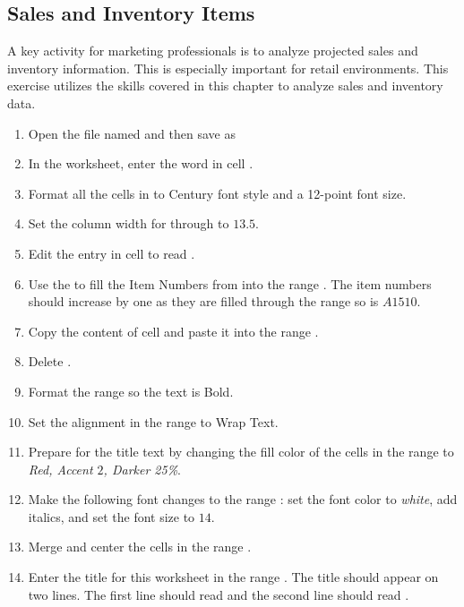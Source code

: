 \subsection{Sales and Inventory Items}

A key activity for marketing professionals is to analyze projected sales and inventory information. This is especially important for retail environments. This exercise utilizes the skills covered in this chapter to analyze sales and inventory data.

\begin{enumerate}
	\item Open the file named  and then save as 
	\item In the  worksheet, enter the word  in cell .
	\item Format all the cells in  to Century font style and a 12-point font size.
	\item Set the column width for  through  to $ 13.5 $.
	\item Edit the entry in cell  to read .
	\item Use the  to fill the Item Numbers from  into the range . The item numbers should increase by one as they are filled through the range so  is $ A1510 $.
	\item Copy the content of cell  and paste it into the range .
	\item Delete .
	\item Format the range  so the text is Bold.
	\item Set the alignment in the range  to Wrap Text.
	\item Prepare  for the title text by changing the fill color of the cells in the range  to \textit{Red, Accent $ 2 $, Darker 25\%}.
	\item Make the following font changes to the range : set the font color to \textit{white}, add italics, and set the font size to $ 14 $.
	\item Merge and center the cells in the range .
	\item Enter the title for this worksheet in the range . The title should appear on two lines. The first line should read  and the second line should read .

\end{enumerate}
